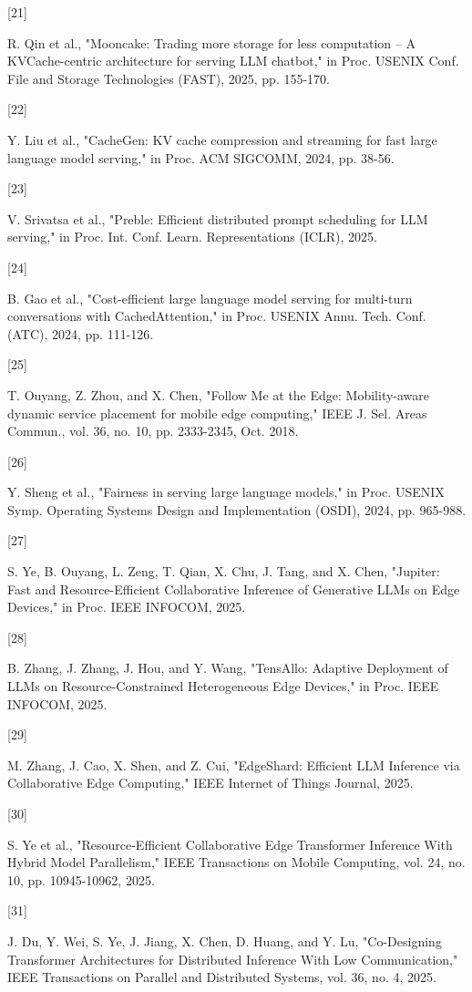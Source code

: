 \hypertarget{ref:21}{[21]} R. Qin et al., "Mooncake: Trading more storage for less computation -- A KVCache-centric architecture for serving LLM chatbot," in Proc. USENIX Conf. File and Storage Technologies (FAST), 2025, pp. 155-170.


\hypertarget{ref:22}{[22]} Y. Liu et al., "CacheGen: KV cache compression and streaming for fast large language model serving," in Proc. ACM SIGCOMM, 2024, pp. 38-56.


\hypertarget{ref:23}{[23]} V. Srivatsa et al., "Preble: Efficient distributed prompt scheduling for LLM serving," in Proc. Int. Conf. Learn. Representations (ICLR), 2025.


\hypertarget{ref:24}{[24]} B. Gao et al., "Cost-efficient large language model serving for multi-turn conversations with CachedAttention," in Proc. USENIX Annu. Tech. Conf. (ATC), 2024, pp. 111-126.


\hypertarget{ref:25}{[25]} T. Ouyang, Z. Zhou, and X. Chen, "Follow Me at the Edge: Mobility-aware dynamic service placement for mobile edge computing," IEEE J. Sel. Areas Commun., vol. 36, no. 10, pp. 2333-2345, Oct. 2018.


\hypertarget{ref:26}{[26]} Y. Sheng et al., "Fairness in serving large language models," in Proc. USENIX Symp. Operating Systems Design and Implementation (OSDI), 2024, pp. 965-988.



\hypertarget{ref:27}{[27]} S. Ye, B. Ouyang, L. Zeng, T. Qian, X. Chu, J. Tang, and X. Chen, "Jupiter: Fast and Resource-Efficient Collaborative Inference of Generative LLMs on Edge Devices," in Proc. IEEE INFOCOM, 2025.

\hypertarget{ref:28}{[28]} B. Zhang, J. Zhang, J. Hou, and Y. Wang, "TensAllo: Adaptive Deployment of LLMs on Resource-Constrained Heterogeneous Edge Devices," in Proc. IEEE INFOCOM, 2025.

\hypertarget{ref:29}{[29]} M. Zhang, J. Cao, X. Shen, and Z. Cui, "EdgeShard: Efficient LLM Inference via Collaborative Edge Computing," IEEE Internet of Things Journal, 2025.

\hypertarget{ref:30}{[30]} S. Ye et al., "Resource-Efficient Collaborative Edge Transformer Inference With Hybrid Model Parallelism," IEEE Transactions on Mobile Computing, vol. 24, no. 10, pp. 10945-10962, 2025.

\hypertarget{ref:31}{[31]} J. Du, Y. Wei, S. Ye, J. Jiang, X. Chen, D. Huang, and Y. Lu, "Co-Designing Transformer Architectures for Distributed Inference With Low Communication," IEEE Transactions on Parallel and Distributed Systems, vol. 36, no. 4, 2025.

